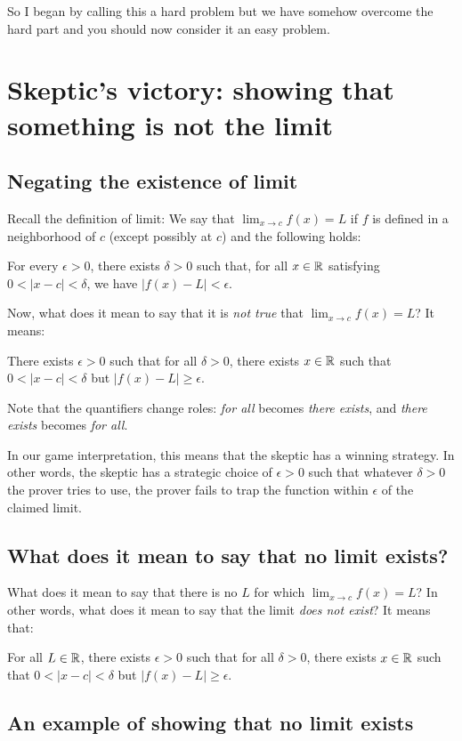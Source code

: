 \documentclass[10pt]{amsart}
\begin{document}
So I began by calling this a hard problem but we have somehow overcome
the hard part and you should now consider it an easy problem.

\section{Skeptic's victory: showing that something is not the limit}

\subsection{Negating the existence of limit}

Recall the definition of limit: We say that $\lim_{x \to c} f(x) = L$
if $f$ is defined in a neighborhood of $c$ (except possibly at $c$)
and the following holds:

For every $\epsilon > 0$, there exists $\delta > 0$ such that, for all
$x \in \mathbb{R}$ satisfying $0 < |x - c| < \delta$, we have $|f(x) - L| <
\epsilon$.

Now, what does it mean to say that it is {\em not true} that $\lim_{x
\to c} f(x) = L$? It means:

There exists $\epsilon > 0$ such that for all $\delta > 0$, there
exists $x \in \mathbb{R}$ such that $0 < |x - c| < \delta$ but $|f(x) - L| \ge
\epsilon$.

Note that the quantifiers change roles: {\em for all} becomes {\em
there exists}, and {\em there exists} becomes {\em for all}.

In our game interpretation, this means that the skeptic has a winning
strategy. In other words, the skeptic has a strategic choice of
$\epsilon > 0$ such that whatever $\delta > 0$ the prover tries to
use, the prover fails to trap the function within $\epsilon$ of the
claimed limit.

\subsection{What does it mean to say that no limit exists?}

What does it mean to say that there is no $L$ for which $\lim_{x \to
c} f(x) = L$? In other words, what does it mean to say that the limit
{\em does not exist}? It means that:

For all $L \in \mathbb{R}$, there exists $\epsilon > 0$ such that for all
$\delta > 0$, there exists $x \in \mathbb{R}$ such that $0 < |x - c| < \delta$
but $|f(x) - L| \ge \epsilon$.

\subsection{An example of showing that no limit exists}
\end{document}
